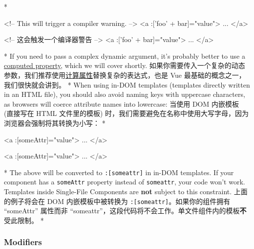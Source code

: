 \begin{paracol}{2}
\switchcolumn[0]*%
\begin{codeHtml}
<!-- This will trigger a compiler warning. -->
<a :['foo' + bar]="value"> ... </a>
\end{codeHtml}  
\switchcolumn
\begin{codeHtml} 
<!-- 这会触发一个编译器警告 -->
<a :['foo' + bar]="value"> ... </a>
\end{codeHtml}  
\switchcolumn[0]*%
If you need to pass a complex dynamic argument, it's probably better to
use a \href{https://vuejs.org/guide/essentials/computed.html}{computed
property}, which we will cover shortly.
\switchcolumn
如果你需要传入一个复杂的动态参数，我们推荐使用\href{https://cn.vuejs.org/guide/essentials/computed.html}{计算属性}替换复杂的表达式，也是
Vue 最基础的概念之一，我们很快就会讲到。
\switchcolumn[0]*%
When using in-DOM templates (templates directly written in an HTML
file), you should also avoid naming keys with uppercase characters, as
browsers will coerce attribute names into lowercase:
\switchcolumn
当使用 DOM 内嵌模板 (直接写在 HTML 文件里的模板)
时，我们需要避免在名称中使用大写字母，因为浏览器会强制将其转换为小写：
\switchcolumn[0]*%
\begin{codeHtml}
<a :[someAttr]="value"> ... </a>
\end{codeHtml}  
\switchcolumn
\begin{codeHtml}
<a :[someAttr]="value"> ... </a>
\end{codeHtml}  
\switchcolumn[0]*%
The above will be converted to \texttt{:{[}someattr{]}} in in-DOM
templates. If your component has a \texttt{someAttr} property instead of
\texttt{someattr}, your code won't work. Templates inside Single-File
Components are \textbf{not} subject to this constraint.
\switchcolumn
上面的例子将会在 DOM 内嵌模板中被转换为
\texttt{:{[}someattr{]}}。如果你的组件拥有 ``someAttr'' 属性而非
``someattr''，这段代码将不会工作。单文件组件内的模板\textbf{不}受此限制。
\switchcolumn[0]*%
\subsubsection{Modifiers}
\switchcolumn

\end{paracol}
